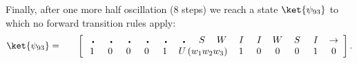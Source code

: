 \documentclass[11pt,letterpaper]{article}
\newcommand{\<}{\langle}
\renewcommand{\>}{\rangle}
\newcommand{\bul}{\:\:\centerdot\:}       %
\newcommand{\iga}{\:I\,}                  %
\newcommand{\wga}{W}						%
\newcommand{\sga}{\:S\,}					%
\begin{document}
Finally, after one more half oscillation (8 steps) we reach a state $\ket{\psi_{93}}$ to which no forward transition rules apply:
\begin{eqnarray}
	\ket{\psi_{93}} &=& \quad \left[ \begin{array}{cccccccccccccc}
		\bul & \bul &  
		\bul & \bul & \bul & \bul & \sga & \wga & \iga & \iga & 
		\wga & \sga & \iga & \rightarrow
		\\		
		1    & 0    & 0    & 0    & 1    & 
		\multicolumn{3}{c}{U\left(w_1w_2w_3\right)}
		 &
		1    & 0    & 0    & 0    & 1	& 0
 	\end{array} \right]. \label{psi93}
\end{eqnarray}
\end{document}
